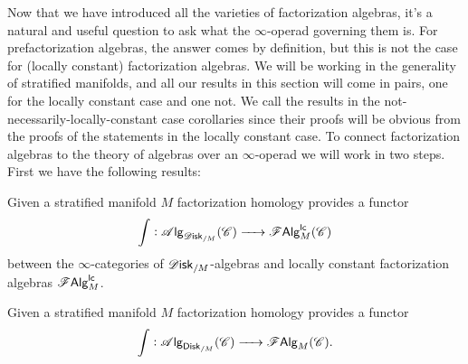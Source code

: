 \documentclass[../text.tex]{subfiles}
\begin{document}
Now that we have introduced all the varieties of factorization algebras, it's a natural and useful question to ask what the $\infty$-operad governing them is. For prefactorization algebras, the answer comes by definition, but this is not the case for (locally constant) factorization algebras. We will be working in the generality of stratified manifolds, and all our results in this section will come in pairs, one for the locally constant case and one not. We call the results in the not-necessarily-locally-constant case corollaries since their proofs will be obvious from the proofs of the statements in the locally constant case. To connect factorization algebras to the theory of algebras over an $\infty$-operad we will work in two steps. First we have the following results:
%
\begin{proposition}\label{prop:fh_disk_to_lcfa}
    Given a stratified manifold $M$ factorization homology provides a functor
    \begin{equation}
        \int : \alg{\disk_{/M}} (\catC) \xrightarrow{\ \ \ \ } \lcfa_M (\catC)
    \end{equation}
    between the $\infty$-categories of $\disk_{/M}$-algebras and locally constant factorization algebras $\mathscr{F} \mathsf{Alg}^{\mathsf{lc}}_M$.
\end{proposition}
%
\begin{corollary}\label{cor:fh_disk_to_falg}
    Given a stratified manifold $M$ factorization homology provides a functor
    \begin{equation}
        \int: \alg{\disk[r]_{/M}} (\catC) \xrightarrow{\ \ \ \ } \falg_{M} (\catC).
    \end{equation}
\end{corollary}
\end{document}
